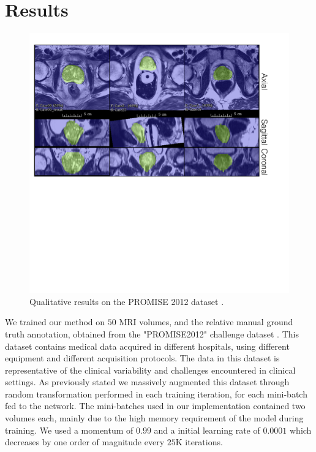 \section{Results}
\label{sec:results}

\begin{figure} 	
\centering 	
\includegraphics[scale=0.18]{qualitativeResults.pdf} 	
\caption{Qualitative results on the PROMISE 2012 dataset \cite{litjens2014evaluation}.} \label{fig:qualitative} 
\end{figure}

We trained our method on $50$ MRI volumes, and the relative manual ground truth annotation, obtained from the "PROMISE2012" challenge dataset \cite{litjens2014evaluation}. This dataset contains medical data acquired in different hospitals, using different equipment and different acquisition protocols. The data in this dataset is representative of the clinical variability and challenges encountered in clinical settings. As previously stated we massively augmented this dataset through random transformation performed in each training iteration, for each mini-batch fed to the network. The mini-batches used in our implementation contained two volumes each, mainly due to the high memory requirement of the model during training. We used a momentum of $0.99$ and a initial learning rate of $0.0001$ which decreases by one order of magnitude every $25$K iterations. 

